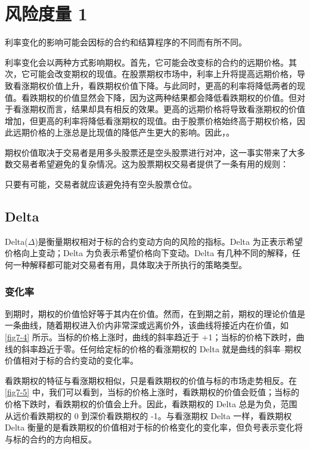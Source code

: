\chapter{风险度量 1}
利率变化的影响可能会因标的合约和结算程序的不同而有所不同。

利率变化会以两种方式影响期权。首先，它可能会改变标的合约的远期价格。其次，它可能会改变期权的现值。在股票期权市场中，利率上升将提高远期价格，导致看涨期权价值上升，看跌期权价值下降。与此同时，更高的利率将降低两者的现值。看跌期权的价值显然会下降，因为这两种结果都会降低看跌期权的价值。但对于看涨期权而言，结果却具有相反的效果。更高的远期价格将导致看涨期权的价值增加，但更高的利率将降低看涨期权的现值。由于股票价格始终高于期权价格，因此远期价格的上涨总是比现值的降低产生更大的影响。因此，。

期权价值取决于交易者是用多头股票还是空头股票进行对冲，这一事实带来了大多数交易者希望避免的复杂情况。这为股票期权交易者提供了一条有用的规则：
\begin{tcolorbox}
    只要有可能，交易者就应该避免持有空头股票仓位。
\end{tcolorbox}
\section{Delta}
Delta($\Delta$)是衡量期权相对于标的合约变动方向的风险的指标。Delta 为正表示希望价格向上变动；Delta 为负表示希望价格向下变动。Delta 有几种不同的解释，任何一种解释都可能对交易者有用，具体取决于所执行的策略类型。
\subsection{变化率}
到期时，期权的价值恰好等于其内在价值。然而，在到期之前，期权的理论价值是一条曲线，随着期权进入价内非常深或远离价外，该曲线将接近内在价值，如 \autoref{fig7-4} 所示。当标的价格上涨时，曲线的斜率趋近于 +1；当标的价格下跌时，曲线的斜率趋近于零。任何给定标的价格的看涨期权的 Delta 就是曲线的斜率--期权价值相对于标的合约变动的变化率。


看跌期权的特征与看涨期权相似，只是看跌期权的价值与标的市场走势相反。在 \autoref{fig7-5} 中，我们可以看到，当标的价格上涨时，看跌期权的价值会贬值；当标的价格下跌时，看跌期权的价值会上升。因此，看跌期权的 Delta 总是为负，范围从远价看跌期权的 0 到深价看跌期权的 -1。与看涨期权 Delta 一样，看跌期权 Delta 衡量的是看跌期权的价值相对于标的价格变化的变化率，但负号表示变化将与标的合约的方向相反。

